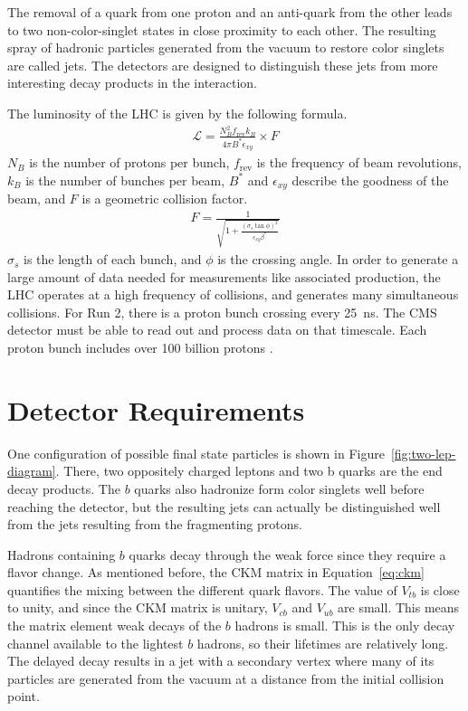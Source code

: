 The removal of a quark from one proton and an anti-quark from the other leads to two
non-color-singlet states in close proximity to each other.
The resulting spray of hadronic particles generated from the vacuum to restore
color singlets are called jets.
The detectors are designed to distinguish these jets from more interesting decay products
in the interaction.

The luminosity of the LHC is given by the following formula.
\begin{gather}
  \mathcal{L} = \frac{N^2_B f_{\text{rev}} k_B}{4\pi B^* \epsilon_{xy}} \times F
\end{gather}
$N_B$ is the number of protons per bunch,
$f_{\text{rev}}$ is the frequency of beam revolutions,
$k_B$ is the number of bunches per beam,
$B^*$ and $\epsilon_{xy}$ describe the goodness of the beam,
and $F$ is a geometric collision factor.
\begin{gather}
  F = \frac{1}{\sqrt{1 + \frac{(\sigma_s \tan \phi)^2}{\epsilon_{xy} \beta^*}}}
\end{gather}
$\sigma_s$ is the length of each bunch,
and $\phi$ is the crossing angle.
In order to generate a large amount of data needed for measurements like associated production,
the LHC operates at a high frequency of collisions, and generates many simultaneous collisions.
For Run 2, there is a proton bunch crossing every \SI{25}{ns}.
The CMS detector must be able to read out and process data on that timescale.
Each proton bunch includes over 100 billion protons \cite{Bruce:2201447}.

\section{Detector Requirements} \label{sec:requirements}

One configuration of possible final state particles is shown in Figure~\ref{fig:two-lep-diagram}.
There, two oppositely charged leptons and two b quarks are the end decay products.
The $b$ quarks also hadronize form color singlets well before reaching the detector,
but the resulting jets can actually be distinguished well from the jets resulting
from the fragmenting protons.

Hadrons containing $b$ quarks decay through the weak force since they require a flavor change.
As mentioned before, the CKM matrix in Equation~\ref{eq:ckm} quantifies the mixing between the different quark flavors.
The value of $V_{tb}$ is close to unity, and since the CKM matrix is unitary,
$V_{cb}$ and $V_{ub}$ are small.
This means the matrix element weak decays of the $b$ hadrons is small.
This is the only decay channel available to the lightest $b$ hadrons,
so their lifetimes are relatively long.
The delayed decay results in a jet with a secondary vertex where many of its particles
are generated from the vacuum at a distance from the initial collision point.

